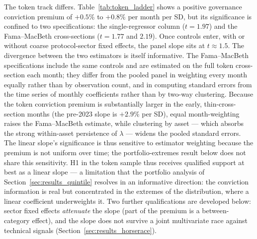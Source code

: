 \documentclass[12pt]{article}
\begin{document}
The token track differs. Table~\ref{tab:token_ladder} shows a positive governance
conviction premium of $+0.5\%$ to $+0.8\%$ per month per SD, but its significance is
confined to two specifications: the single-regressor column ($t=1.97$) and the
Fama--MacBeth cross-sections ($t=1.77$ and $2.19$). Once controls enter, with or
without coarse protocol-sector fixed effects, the panel slope sits at $t \approx 1.5$. The
divergence between the two estimators is itself informative. The Fama--MacBeth
specifications include the same controls and are estimated on the full token
cross-section each month; they differ from the pooled panel in weighting every month
equally rather than by observation count, and in computing standard errors from the
time series of monthly coefficients rather than by two-way clustering. Because the
token conviction premium is substantially larger in the early, thin-cross-section
months (the pre-2023 slope is $+2.9\%$ per SD), equal month-weighting raises the
Fama--MacBeth estimate, while clustering by asset --- which absorbs the strong
within-asset persistence of $\lambda$ --- widens the pooled standard errors. The
linear slope's significance is thus sensitive to estimator weighting because the
premium is not uniform over time; the portfolio-extremes result below does not share
this sensitivity.
H1 in the token sample thus receives qualified support at best as a linear slope ---
a limitation that the portfolio analysis of Section~\ref{sec:results_quintile}
resolves in an informative direction: the conviction information is real but
concentrated in the extremes of the distribution, where a linear coefficient
underweights it. Two further qualifications are developed below: sector fixed effects
\textit{attenuate} the slope (part of the premium is a between-category effect), and
the slope does not survive a joint multivariate race against technical signals
(Section~\ref{sec:results_horserace}).
\end{document}
